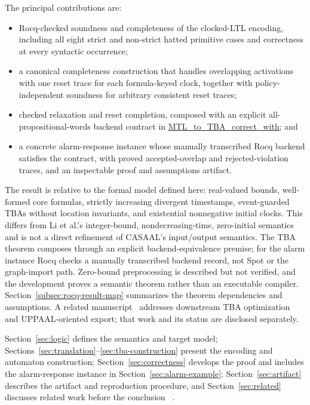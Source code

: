 \documentclass{ieeeaccess}
\newcommand{\Rocqid}[1]{\url{#1}}
\begin{document}
The principal contributions are:
\begin{itemize}
  \item Rocq-checked soundness and completeness of the clocked-LTL encoding,
        including all eight strict and non-strict hatted primitive cases and
        correctness at every syntactic occurrence;
  \item a canonical completeness construction that handles overlapping
        activations with one reset trace for each formula-keyed clock,
        together with policy-independent soundness for arbitrary consistent
        reset traces;
  \item checked relaxation and reset completion, composed with an explicit
        all-propositional-words backend contract in
        \Rocqid{MTL_to_TBA_correct_with}; and
  \item a concrete alarm-response instance whose manually transcribed Rocq
        backend satisfies the contract, with proved accepted-overlap and
        rejected-violation traces, and an inspectable proof and assumptions
        artifact.
\end{itemize}

The result is relative to the formal model defined here: real-valued bounds,
well-formed core formulas, strictly increasing divergent timestamps,
event-guarded TBAs without location invariants, and existential nonnegative
initial clocks. This differs from Li et al.'s integer-bound,
nondecreasing-time, zero-initial semantics and is not a direct refinement of
CASAAL's input/output semantics. The TBA theorem composes through an explicit
backend-equivalence premise; for the alarm instance Rocq checks a manually
transcribed backend record, not Spot or the graph-import path. Zero-bound
preprocessing is described but not verified, and the development proves a
semantic theorem rather than an executable compiler. Section~\ref{subsec:rocq-result-map}
summarizes the theorem dependencies and assumptions.
A related manuscript~\cite{fares_bodeveix_tba_optimization} addresses
downstream TBA optimization and UPPAAL-oriented export; that work and its
status are disclosed separately.

Section~\ref{sec:logic} defines the semantics and target model;
Sections~\ref{sec:translation}--\ref{sec:tba-construction} present the encoding and
automaton construction; Section~\ref{sec:correctness} develops the proof and
includes the alarm-response instance in Section~\ref{sec:alarm-example};
Section~\ref{sec:artifact} describes the artifact and reproduction procedure,
and Section~\ref{sec:related} discusses related work before the conclusion
~\cite{openai_codex}.
\end{document}
